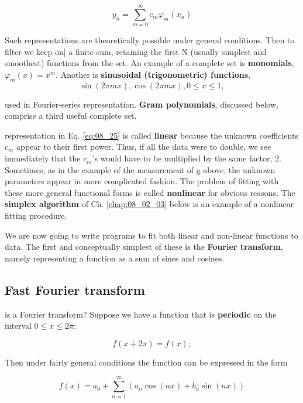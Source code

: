 \begin{itemize}
    \begin{equation}\label{eq:08_25}
    y_n = \sum_{m=0}^{\infty}c_{m}\varphi_{m}(x_{n})
    \end{equation}

    Such representations are theoretically possible under general conditions. Then to filter we keep on] a finite sum, retaining the first N (usually simplest and smoothest) functions from the set. An example of a complete set is \textbf{monomials}, $\varphi_{m}(x) = x^{m}$. Another is \textbf{sinusoidal (trigonometric) functions},
    \begin{equation*}
        \sin(2\pi mx), \cos(2\pi mx), 0 \leq x \leq 1,
    \end{equation*}
    
    used in Fourier-series representation. \textbf{Gram polynomials}, discussed below, comprise a third useful complete set.
\end{itemize}

 representation in Eq. \ref{eq:08_25} is called \textbf{linear} because the unknown coefficients $c_{m}$ appear to their first power. Thus, if all the data were to double, we see immediately that the $c_{m}$'s would have to be multiplied by the same factor, 2. Sometimes, as in the example of the measurement of g above, the unknown parameters appear in more complicated fashion. The problem of fitting with these more general functional forms is called \textbf{nonlinear} for obvious reasons. The \textbf{simplex algorithm} of Ch. \ref{chap:08_02_03} below is an example of a nonlinear fitting procedure.

We are now going to write programs to fit both linear and non-linear functions to data. The first and conceptually simplest of these is the \textbf{Fourier transform}, namely representing a function as a sum of sines and cosines.

\subsection{Fast Fourier transform}
 is a Fourier transform? Suppose we have a function that is \textbf{periodic} on the interval $0 \leq x \leq 2\pi$:

\begin{equation*}
f(x + 2\pi) = f(x) ;
\end{equation*}

Then under fairly general conditions the function can be expressed in the form

\begin{equation}\label{eq:08_26}
f(x) = a_{0} + \sum_{n=1}^{\infty} (a_{n} \cos(nx) + b_{n} \sin(nx))
\end{equation}

